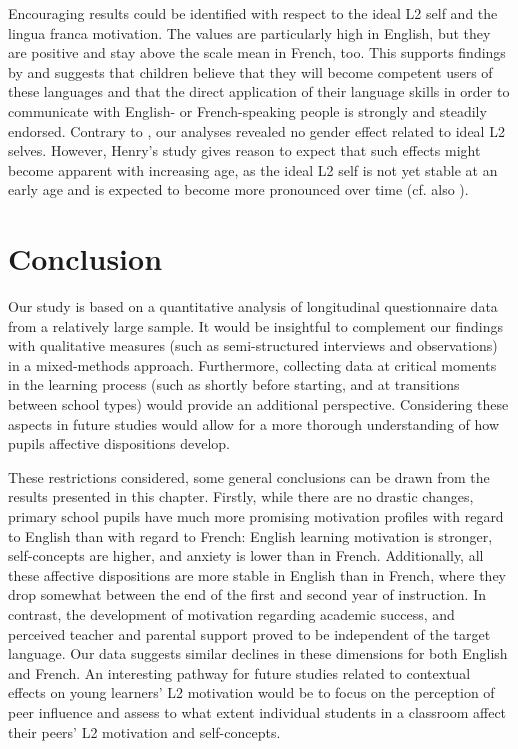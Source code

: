 \documentclass[output=paper]{langsci/langscibook}
\begin{document}
Encouraging results could be identified with respect to the ideal L2 self and the lingua franca motivation. The values are particularly high in English, but they are positive and stay above the scale mean in French, too. This supports findings by \citet{Heinzmann2013} and suggests that children believe that they will become competent users of these languages and that the direct application of their language skills in order to communicate with English- or French-speaking people is strongly and steadily endorsed. Contrary to \citet{Henry2009}, our analyses revealed no gender effect related to ideal L2 selves. However, Henry’s study gives reason to expect that such effects might become apparent with increasing age, as the ideal L2 self is not yet stable at an early age and is expected to become more pronounced over time (cf. also \citealt{Doernyei2009}).

\section{Conclusion}

Our study is based on a quantitative analysis of longitudinal questionnaire data from a relatively large sample. It would be insightful to complement our findings with qualitative measures (such as semi-structured interviews and observations) in a mixed-methods approach. Furthermore, collecting data at critical moments in the learning process (such as shortly before starting, and at transitions between school types) would provide an additional perspective. Considering these aspects in future studies would allow for a more thorough understanding of how pupils affective dispositions develop.

These restrictions considered, some general conclusions can be drawn from the results presented in this chapter. Firstly, while there are no drastic changes, primary school pupils have much more promising motivation profiles with regard to English than with regard to French: English learning motivation is stronger, self-concepts are higher, and anxiety is lower than in French. Additionally, all these affective dispositions are more stable in English than in French, where they drop somewhat between the end of the first and second year of instruction. In contrast, the development of motivation regarding academic success, and perceived teacher and parental support proved to be independent of the target language. Our data suggests similar declines in these dimensions for both English and French. An interesting pathway for future studies related to contextual effects on young learners’ L2 motivation would be to focus on the perception of peer influence and assess to what extent individual students in a classroom affect their peers’ L2 motivation and self-concepts.


{\sloppy\printbibliography[heading=subbibliography,notkeyword=this]}
\end{document}
